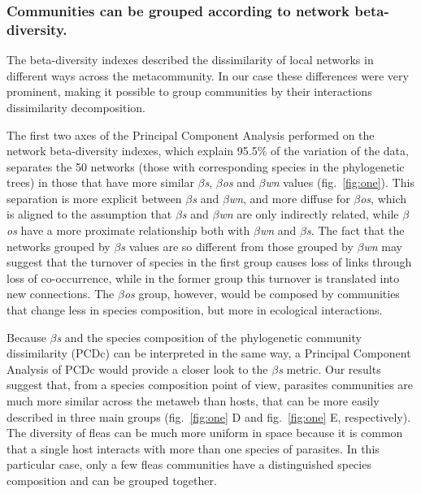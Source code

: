 \documentclass[11pt]{article}
\begin{document}
\hypertarget{communities-can-be-grouped-according-to-network-beta-diversity.}{%
\subsubsection{Communities can be grouped according to network
beta-diversity.}\label{communities-can-be-grouped-according-to-network-beta-diversity.}}

The beta-diversity indexes described the dissimilarity of local networks
in different ways across the metacommunity. In our case these
differences were very prominent, making it possible to group communities
by their interactions dissimilarity decomposition.

The first two axes of the Principal Component Analysis performed on the
network beta-diversity indexes, which explain 95.5\% of the variation of
the data, separates the 50 networks (those with corresponding species in
the phylogenetic trees) in those that have more similar
\emph{\(\beta\)s}, \emph{\(\beta\)os} and \emph{\(\beta\)wn} values
(fig.~\ref{fig:one}). This separation is more explicit between
\emph{\(\beta\)s} and \emph{\(\beta\)wn}, and more diffuse for
\emph{\(\beta\)os}, which is aligned to the assumption that
\emph{\(\beta\)s} and \emph{\(\beta\)wn} are only indirectly related,
while \emph{\(\beta\)os} have a more proximate relationship both with
\emph{\(\beta\)wn} and \emph{\(\beta\)s}. The fact that the networks
grouped by \emph{\(\beta\)s} values are so different from those grouped
by \emph{\(\beta\)wn} may suggest that the turnover of species in the
first group causes loss of links through loss of co-occurrence, while in
the former group this turnover is translated into new connections. The
\emph{\(\beta\)os} group, however, would be composed by communities that
change less in species composition, but more in ecological interactions.

Because \emph{\(\beta\)s} and the species composition of the
phylogenetic community dissimilarity (PCDc) can be interpreted in the
same way, a Principal Component Analysis of PCDc would provide a closer
look to the \emph{\(\beta\)s} metric. Our results suggest that, from a
species composition point of view, parasites communities are much more
similar across the metaweb than hosts, that can be more easily described
in three main groups (fig.~\ref{fig:one} D and fig.~\ref{fig:one} E,
respectively). The diversity of fleas can be much more uniform in space
because it is common that a single host interacts with more than one
species of parasites. In this particular case, only a few fleas
communities have a distinguished species composition and can be grouped
together.
\end{document}
